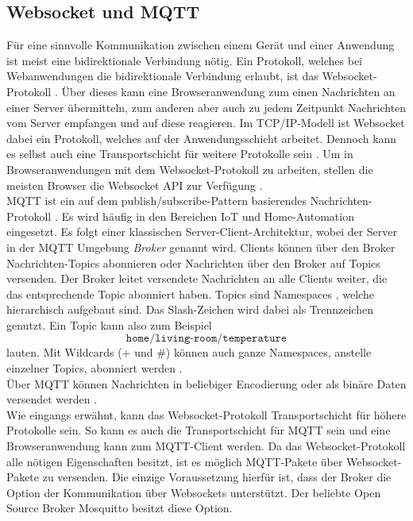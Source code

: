 \subsection{Websocket und MQTT}
\label{subs:websocket-und-mqtt}

Für eine sinnvolle Kommunikation zwischen einem Gerät und einer Anwendung ist meist
eine bidirektionale Verbindung nötig. Ein Protokoll, welches bei Webanwendungen die 
bidirektionale Verbindung erlaubt, ist das Websocket-Protokoll \cite{rfc-websocket}. Über dieses
kann eine Browseranwendung zum einen Nachrichten an einer Server übermitteln, zum anderen 
aber auch zu jedem Zeitpunkt Nachrichten vom Server empfangen und auf diese reagieren.
Im TCP/IP-Modell ist Websocket dabei ein Protokoll, welches auf der Anwendungsschicht arbeitet. 
Dennoch kann es selbst auch eine Transportschicht für weitere Protokolle sein \cite{websocket-definitive}.
Um in Browseranwendungen mit dem Websocket-Protokoll zu arbeiten, stellen die meisten 
Browser die Websocket API zur Verfügung \cite{websocket-api}.\\

MQTT ist ein auf dem publish/subscribe-Pattern basierendes Nachrichten-Protokoll \cite{mqtt-standard}.
Es wird häufig in den Bereichen IoT und Home-Automation eingesetzt. Es folgt einer
klassischen Server-Client-Architektur, wobei der Server in der MQTT Umgebung \emph{Broker}
genannt wird. Clients können über den Broker Nachrichten-Topics abonnieren oder Nachrichten
über den Broker auf Topics versenden. Der Broker leitet versendete Nachrichten an alle Clients
weiter, die das entsprechende Topic abonniert haben. Topics sind Namespaces , welche hierarchisch
aufgebaut sind. Das Slash-Zeichen wird dabei als Trennzeichen genutzt. Ein Topic kann also zum 
Beispiel 
\[\texttt{home/living-room/temperature} \]
lauten. Mit Wildcards (+ und \#) können auch ganze
Namespaces, anstelle einzelner Topics, abonniert werden \cite{mqtt-man-page}.\\
Über MQTT können Nachrichten in beliebiger Encodierung oder als binäre Daten versendet werden
\cite{mqtt-essentials-part-4}.\\

Wie eingangs erwähnt, kann das Websocket-Protokoll Transportschicht für
höhere Protokolle sein. So kann es auch die Transportschicht für MQTT sein und eine Browseranwendung
kann zum MQTT-Client werden. Da das Websocket-Protokoll alle nötigen Eigenschaften besitzt, ist es
möglich MQTT-Pakete über Websocket-Pakete zu versenden. Die einzige Voraussetzung hierfür ist, dass der Broker
die Option der Kommunikation über Websockets unterstützt. Der beliebte Open Source Broker Mosquitto \cite{mosquitto}
besitzt diese Option.